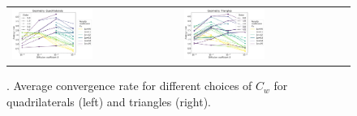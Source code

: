 \begin{example}
\begin{figure}[h!]
    \centering
    \begin{tabular}{p{} p{}}
        \vspace{0pt}
        \includegraphics[width=0.5\textwidth]{../figs/parametric/advdiff_2D/ord_quarteroni2_2_4}
        &
        \vspace{0pt}
        \includegraphics[width=0.5\textwidth]{../figs/parametric/advdiff_2D/ord_quarteroni2_2_3}
    \end{tabular}
    \caption{. Average convergence rate for different choices of $C_w$ for
        quadrilaterals (left) and triangles (right).}
    \label{fig:orders_quarteroni2}
\end{figure}
\end{example}

